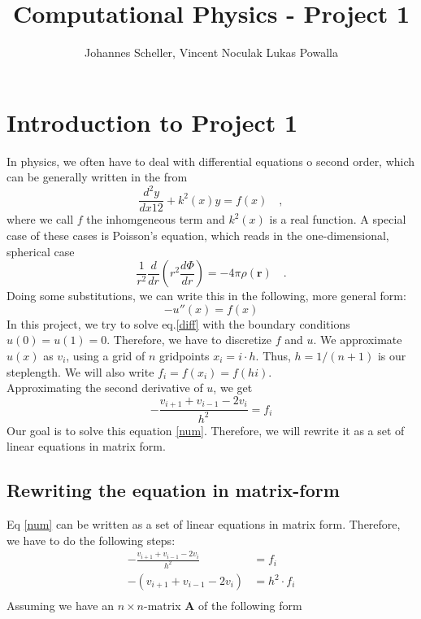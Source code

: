 \documentclass[10pt,a4paper]{article}
\author{Johannes Scheller, Vincent Noculak Lukas Powalla}
\title{Computational Physics - Project 1}
\begin{document}
\maketitle
\newpage
\tableofcontents
\newpage
\section{Introduction to Project 1}
In physics, we often have to deal with differential equations o second order, which can be generally written in the from
\begin{equation}
	\frac{d^{2}y}{dx1{2}}+k^2(x)y=f(x)\quad,
\end{equation}
where we call $f$ the inhomgeneous term and $k^2(x)$ is a real function. A special case of these cases is Poisson's equation, which reads in the one-dimensional, spherical case
\begin{equation}
	\frac{1}{r^2}\frac{d}{dr}\left(r^2\frac{d\Phi}{dr}\right)=-4\pi\rho\left(\mathbf{r}\right)\quad.
\end{equation}
Doing some substitutions, we can write this in the following, more general form:
\begin{equation}
	\label{diff}
	-u''(x)=f(x)
\end{equation}
In this project, we try to solve eq.\eqref{diff} with the boundary conditions $u(0)=u(1)=0$. Therefore, we have to discretize $f$ and $u$. We approximate $u(x)$ as $v_i$, using a grid of $n$ gridpoints $x_i=i\cdot h$. Thus, $h=1/(n+1)$ is our steplength. We will also write $f_i=f(x_i)=f(hi)$.\\Approximating the second derivative of $u$, we get
\begin{equation}
	\label{num}
	-\frac{v_{i+1}+v_{i-1}-2v_i}{h^2}=f_i
\end{equation}
Our goal is to solve this equation \eqref{num}. Therefore, we will rewrite it as a set of linear equations in matrix form.

\subsection{Rewriting the equation in matrix-form}
Eq \eqref{num} can be written as a set of linear equations in matrix form. Therefore, we have to do the following steps:
\begin{align}
	-\frac{v_{i+1}+v_{i-1}-2v_i}{h^2}&=f_i\nonumber\\
	\label{vorform}-\left(v_{i+1}+v_{i-1}-2v_i\right)&=h^2\cdot f_i\\
\end{align}
Assuming we have an $n\times n$-matrix $\mathbf A$ of the following form
\end{document}
